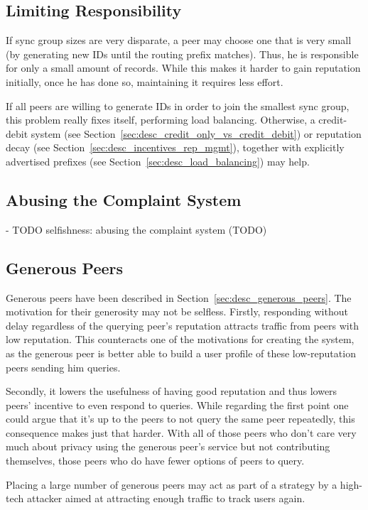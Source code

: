 \subsection{Limiting Responsibility}
If sync group sizes are very disparate, a peer may choose one that is very small
(by generating new IDs until the routing prefix matches). Thus, he is
responsible for only a small amount of records. While this makes it harder to
gain reputation initially, once he has done so, maintaining it requires less
effort.

If all peers are willing to generate IDs in order to join the smallest sync
group, this problem really fixes itself, performing load balancing. Otherwise, a
credit-debit system (see Section~\ref{sec:desc_credit_only_vs_credit_debit}) or
reputation decay (see Section~\ref{sec:desc_incentives_rep_mgmt}), together with
explicitly advertised prefixes (see Section~\ref{sec:desc_load_balancing}) may
help.

\subsection{Abusing the Complaint System}
- TODO selfishness: abusing the complaint system (TODO)

\subsection{Generous Peers}
\label{sec:desc_attacks_generous}
Generous peers have been described in Section~\ref{sec:desc_generous_peers}.
The motivation for their generosity may not be selfless. Firstly, responding
without delay regardless of the querying peer's reputation attracts traffic from
peers with low reputation. This counteracts one of the motivations for creating
the system, as the generous peer is better able to build a user profile of these
low-reputation peers sending him queries.

Secondly, it lowers the usefulness of having good reputation and thus lowers
peers' incentive to even respond to queries. While regarding the first point one
could argue that it's up to the peers to not query the same peer repeatedly,
this consequence makes just that harder. With all of those peers who don't care
very much about privacy using the generous peer's service but not contributing
themselves, those peers who do have fewer options of peers to query.

Placing a large number of generous peers may act as part of a strategy by a
high-tech attacker aimed at attracting enough traffic to track users again.


